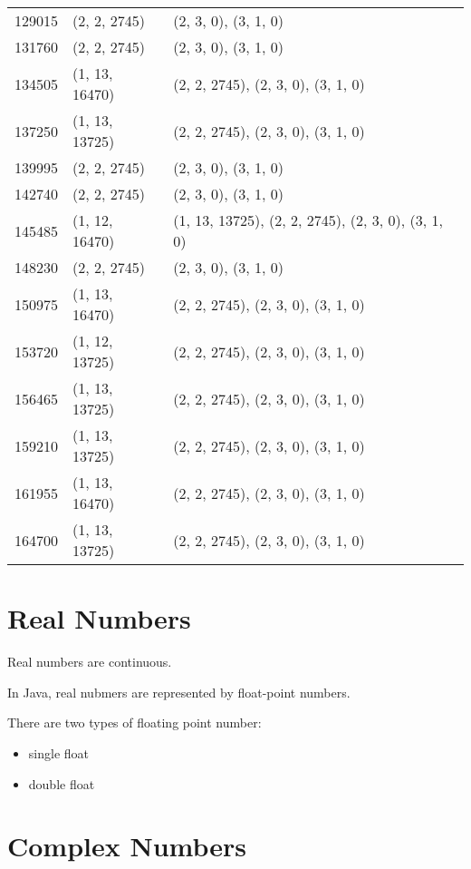 \documentclass[notitlepage,openany]{book}
\begin{document}
\begin{center}
\begin{longtable}{|l|l|l|}
        129015 & (2, 2, 2745) & (2, 3, 0), (3, 1, 0) \\
        131760 & (2, 2, 2745) & (2, 3, 0), (3, 1, 0) \\
        134505 & (1, 13, 16470) & (2, 2, 2745), (2, 3, 0), (3, 1, 0) \\
        137250 & (1, 13, 13725) & (2, 2, 2745), (2, 3, 0), (3, 1, 0) \\
        139995 & (2, 2, 2745) & (2, 3, 0), (3, 1, 0) \\
        142740 & (2, 2, 2745) & (2, 3, 0), (3, 1, 0) \\
        145485 & (1, 12, 16470) & (1, 13, 13725), (2, 2, 2745), (2, 3, 0), (3, 1, 0) \\
        148230 & (2, 2, 2745) & (2, 3, 0), (3, 1, 0) \\
        150975 & (1, 13, 16470) & (2, 2, 2745), (2, 3, 0), (3, 1, 0) \\
        153720 & (1, 12, 13725) & (2, 2, 2745), (2, 3, 0), (3, 1, 0) \\
        156465 & (1, 13, 13725) & (2, 2, 2745), (2, 3, 0), (3, 1, 0) \\
        159210 & (1, 13, 13725) & (2, 2, 2745), (2, 3, 0), (3, 1, 0) \\
        161955 & (1, 13, 16470) & (2, 2, 2745), (2, 3, 0), (3, 1, 0) \\
        164700 & (1, 13, 13725) & (2, 2, 2745), (2, 3, 0), (3, 1, 0) \\
    \end{longtable}
    \end{center}

\chapter{Real Numbers}

    Real numbers are continuous.

    In Java, real nubmers are represented by float-point numbers.

    There are two types of floating point number:

    \begin{itemize}
        \item single float 
        \item double float 
    \end{itemize}

\chapter{Complex Numbers}
\end{document}
